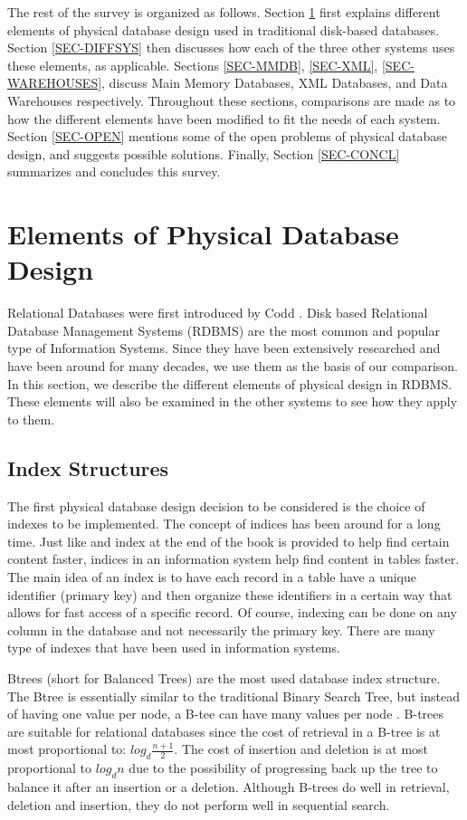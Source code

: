 \documentclass[12pt,a4paper]{article}
\begin{document}
The rest of the survey is organized as follows. Section \ref{SEC-ELEMENTS} first explains different elements of physical database design used in traditional
disk-based databases. Section \ref{SEC-DIFFSYS} then discusses how each of the three other systems uses these elements, as applicable. Sections \ref{SEC-MMDB},
\ref{SEC-XML}, \ref{SEC-WAREHOUSES}, discuss Main Memory Databases, XML Databases, and Data Warehouses respectively. Throughout these sections, comparisons are
made as to how the different elements have been modified to fit the needs of each system. Section \ref{SEC-OPEN} mentions some of the open problems of physical
database design, and suggests possible solutions. Finally, Section \ref{SEC-CONCL} summarizes and concludes this survey.

\section{Elements of Physical Database Design}
\label{SEC-ELEMENTS}

Relational Databases were first introduced by Codd \cite{codd1970relational}. Disk based Relational Database Management Systems (RDBMS) are the most common and
popular type of Information Systems. Since they have been extensively researched and have been around for many decades, we use them as the basis of our
comparison. In this section, we describe the different elements of physical design in RDBMS. These elements will also be examined in the other systems to see
how they apply to them.

\subsection{Index Structures}

The first physical database design decision to be considered is the choice of indexes to be implemented. The concept of indices has been around for a long time.
Just like and index at the end of the book is provided to help find certain content faster, indices in an information system help find content in tables faster.
The main idea of an index is to have each record in a table have a unique identifier (primary key) and then organize these identifiers in a certain way that
allows for fast access of a specific record. Of course, indexing can be done on any column in the database and not necessarily the primary key. There are many
type of indexes that have been used in information systems.

Btrees (short for Balanced Trees) are the most used database index structure.  The Btree is essentially similar to the traditional Binary Search Tree, but
instead of having one value per node, a B-tee can have many values per node \cite{comer1979ubiquitous}. B-trees are suitable for relational databases since the
cost of retrieval in a B-tree is at most proportional to: $log_{d}\frac{n+1}{2}$. The cost of insertion and deletion is at most proportional to $log_{d}n$ due
to the possibility of progressing back up the tree to balance it after an insertion or a deletion. Although B-trees do well in retrieval, deletion and
insertion, they do not perform well in sequential search. 
\end{document}
